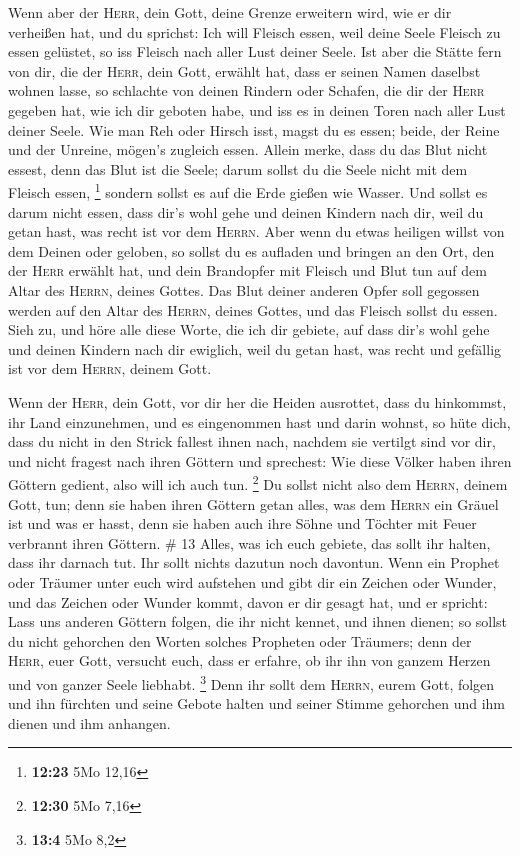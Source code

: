  Wenn aber der \textsc{Herr}, dein Gott, deine Grenze
erweitern wird, wie er dir verheißen hat, und du sprichst: Ich will
Fleisch essen, weil deine Seele Fleisch zu essen gelüstet, so iss
Fleisch nach aller Lust deiner Seele.  Ist aber die
Stätte fern von dir, die der \textsc{Herr}, dein Gott, erwählt hat, dass
er seinen Namen daselbst wohnen lasse, so schlachte von deinen Rindern
oder Schafen, die dir der \textsc{Herr} gegeben hat, wie ich dir geboten
habe, und iss es in deinen Toren nach aller Lust deiner Seele.
 Wie man Reh oder Hirsch isst, magst du es essen; beide,
der Reine und der Unreine, mögen's zugleich essen. 
Allein merke, dass du das Blut nicht essest, denn das Blut ist die
Seele; darum sollst du die Seele nicht mit dem Fleisch essen,
\footnote{\textbf{12:23} 5Mo 12,16}  sondern sollst es
auf die Erde gießen wie Wasser.  Und sollst es darum
nicht essen, dass dir's wohl gehe und deinen Kindern nach dir, weil du
getan hast, was recht ist vor dem \textsc{Herrn}.  Aber
wenn du etwas heiligen willst von dem Deinen oder geloben, so sollst du
es aufladen und bringen an den Ort, den der \textsc{Herr} erwählt hat,
 und dein Brandopfer mit Fleisch und Blut tun auf dem
Altar des \textsc{Herrn}, deines Gottes. Das Blut deiner anderen Opfer
soll gegossen werden auf den Altar des \textsc{Herrn}, deines Gottes,
und das Fleisch sollst du essen.  Sieh zu, und höre alle
diese Worte, die ich dir gebiete, auf dass dir's wohl gehe und deinen
Kindern nach dir ewiglich, weil du getan hast, was recht und gefällig
ist vor dem \textsc{Herrn}, deinem Gott.

 Wenn der \textsc{Herr}, dein Gott, vor dir her die
Heiden ausrottet, dass du hinkommst, ihr Land einzunehmen, und es
eingenommen hast und darin wohnst,  so hüte dich, dass du
nicht in den Strick fallest ihnen nach, nachdem sie vertilgt sind vor
dir, und nicht fragest nach ihren Göttern und sprechest: Wie diese
Völker haben ihren Göttern gedient, also will ich auch tun. \footnote{\textbf{12:30}
  5Mo 7,16}  Du sollst nicht also dem \textsc{Herrn},
deinem Gott, tun; denn sie haben ihren Göttern getan alles, was dem
\textsc{Herrn} ein Gräuel ist und was er hasst, denn sie haben auch ihre
Söhne und Töchter mit Feuer verbrannt ihren Göttern. \# 13
 Alles, was ich euch gebiete, das sollt ihr halten, dass
ihr darnach tut. Ihr sollt nichts dazutun noch davontun. 
Wenn ein Prophet oder Träumer unter euch wird aufstehen und gibt dir ein
Zeichen oder Wunder,  und das Zeichen oder Wunder kommt,
davon er dir gesagt hat, und er spricht: Lass uns anderen Göttern
folgen, die ihr nicht kennet, und ihnen dienen;  so sollst
du nicht gehorchen den Worten solches Propheten oder Träumers; denn der
\textsc{Herr}, euer Gott, versucht euch, dass er erfahre, ob ihr ihn von
ganzem Herzen und von ganzer Seele liebhabt. \footnote{\textbf{13:4} 5Mo
  8,2}  Denn ihr sollt dem \textsc{Herrn}, eurem Gott,
folgen und ihn fürchten und seine Gebote halten und seiner Stimme
gehorchen und ihm dienen und ihm anhangen.

